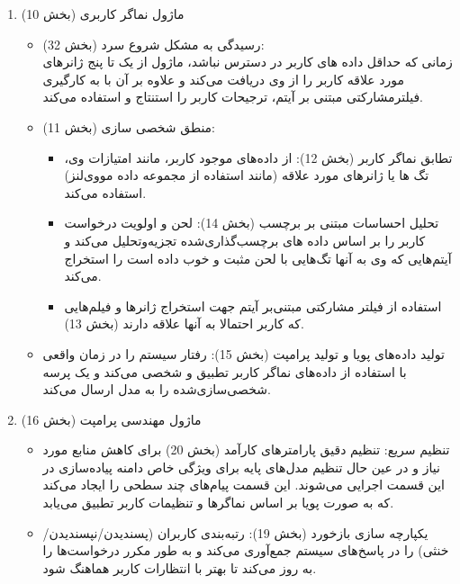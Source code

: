 \begin{enumerate}
\item
 ماژول نماگر کاربری (بخش 10)
\begin{itemize}
\item
رسیدگی به مشکل شروع سرد (بخش 32):\\
 زمانی که حداقل داده های کاربر در دسترس نباشد، ماژول از یک تا پنج ژانرهای مورد علاقه کاربر را از وی دریافت می‌کند و علاوه بر آن با به کارگیری فیلترمشارکتی مبتنی بر آیتم،  ترجیحات کاربر را استنتاج و استفاده می‌کند.
\item
منطق شخصی سازی (بخش 11):
\begin{itemize}
\item
تطابق نماگر کاربر (بخش 12): از داده‌های موجود کاربر، مانند امتیازات وی، تگ ها یا ژانرهای مورد علاقه (مانند استفاده از مجموعه داده مووی‌لنز) استفاده می‌کند.
\item
تحلیل احساسات مبتنی بر برچسب (بخش 14): لحن و اولویت درخواست کاربر را بر اساس داده های برچسب‌گذاری‌شده تجزیه‌وتحلیل می‌کند و آیتم‌هایی که وی به آنها تگ‌هایی با لحن مثبت و خوب داده است را استخراج می‌کند.
\item
استفاده از فیلتر مشارکتی مبتنی‌بر آیتم جهت استخراج ژانرها و فیلم‌هایی که کاربر احتمالا به آنها علاقه دارند (بخش 13).
\end{itemize}

\item
تولید داده‌های پویا و تولید پرامپت (بخش 15): رفتار سیستم را در زمان واقعی با استفاده از داده‌های نماگر کاربر تطبیق و شخصی می‌کند و یک پرسه شخصی‌سازی‌شده را به مدل ارسال می‌کند.
\end{itemize}


\item
ماژول مهندسی پرامپت (بخش 16)
\begin{itemize}
\item
تنظیم سریع: 
تنظیم دقیق پارامترهای کارآمد%
 (بخش 20) برای کاهش منابع مورد نیاز و در عین حال تنظیم مدل‌های پایه برای ویژگی خاص دامنه پیاده‌سازی در این قسمت اجرایی می‌شوند. این قسمت پیام‌های چند سطحی را ایجاد می‌کند که به صورت پویا بر اساس نماگر‌ها و تنظیمات کاربر تطبیق می‌یابد.
\item
یکپارچه سازی بازخورد (بخش 19):
رتبه‌بندی کاربران (پسندیدن/نپسندیدن/خنثی) را در پاسخ‌های سیستم جمع‌آوری می‌کند و به طور مکرر درخواست‌ها را به روز می‌کند تا بهتر با انتظارات کاربر هماهنگ شود.
\end{itemize}


\end{enumerate}
